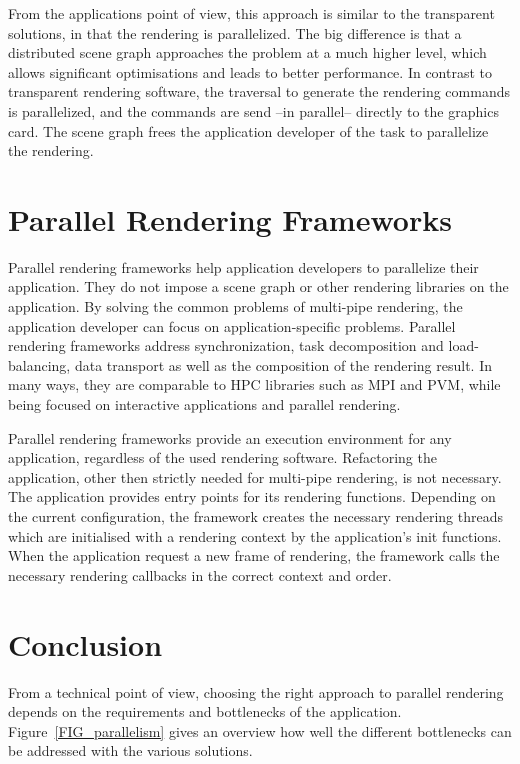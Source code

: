 \documentclass[10pt,a4paper]{scrartcl}
\begin{document}
From the applications point of view, this approach is similar to the
transparent solutions, in that the rendering is parallelized. The big
difference is that a distributed scene graph approaches the problem at a
much higher level, which allows significant optimisations and leads to
better performance. In contrast to transparent rendering software, the
traversal to generate the rendering commands is parallelized, and the
commands are send --in parallel-- directly to the graphics card. The
scene graph frees the application developer of the task to parallelize
the rendering.

\section{Parallel Rendering Frameworks}
Parallel rendering frameworks help application developers to parallelize
their application. They do not impose a scene graph or other rendering
libraries on the application. By solving the common problems of
multi-pipe rendering, the application developer can focus on
application-specific problems. Parallel rendering frameworks address
synchronization, task decomposition and load-balancing, data transport
as well as the composition of the rendering result. In many ways, they
are  comparable to HPC libraries such as MPI and PVM, while being
focused on interactive applications and parallel rendering.

Parallel rendering frameworks provide an execution environment for any
application, regardless of the used rendering software. Refactoring the
application, other then strictly needed for multi-pipe rendering, is not
necessary. The application provides entry points for its rendering
functions. Depending on the current configuration, the framework creates
the necessary rendering threads which are initialised with a rendering
context by the application's init functions. When the application
request a new frame of rendering, the framework calls the necessary
rendering callbacks in the correct context and order.

\section{Conclusion}

From a technical point of view, choosing the right approach to
parallel rendering depends on the requirements and bottlenecks of the
application. Figure~\ref{FIG_parallelism} gives an overview how well the
different bottlenecks can be addressed with the various solutions.
\end{document}
